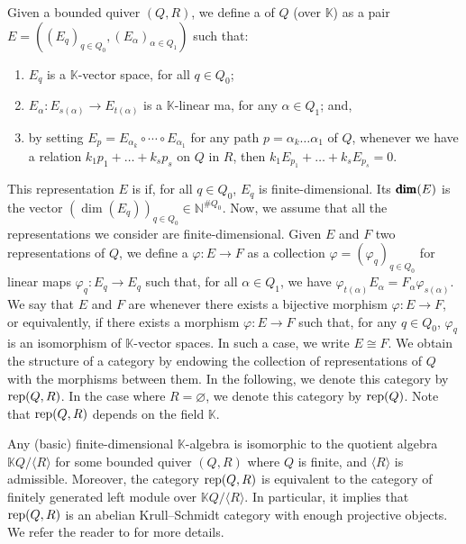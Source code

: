 Given a bounded quiver $(Q,R)$, we define a  of $Q$ (over $\mathbb{K}$) as a pair $E=((E_q)_{q \in Q_0}, (E_\alpha)_{\alpha \in Q_1})$ such that:
\begin{enumerate}[label=$\bullet$, itemsep=1mm]
    \item $E_q$ is a $\mathbb{K}$-vector space, for all $q \in Q_0$;
    \item  $E_\alpha : E_{s(\alpha)} \longrightarrow E_{t(\alpha)}$ is a $\mathbb{K}$-linear ma, for any $\alpha \in Q_1$; and,
    \item by setting $E_p = E_{\alpha_k} \circ \cdots \circ E_{\alpha_1}$ for any path $p = \alpha_k \ldots \alpha_1$ of $Q$, whenever we have a relation $k_1 p_1 + \ldots + k_s p_s$ on $Q$ in $R$, then $k_1 E_{p_1} + \ldots  + k_s E_{p_s} = 0$.
\end{enumerate}
This representation $E$ is  if, for all $q \in Q_0$, $E_q$ is finite-dimensional. Its  $\operatorname{\pmb{\dim}}(E)$ is the vector $(\dim(E_q))_{q \in Q_0} \in \mathbb{N}^{\#Q_0}$. Now, we assume that all the representations we consider are finite-dimensional. Given $E$ and $F$ two representations of $Q$, we define a  $\varphi : E \longrightarrow F$ as a collection $\varphi = (\varphi_q)_{q \in Q_0}$ for linear maps $\varphi_q : E_q \longrightarrow E_q$ such that, for all $\alpha \in Q_1$, we have $\varphi_{t(\alpha)} E_\alpha = F_\alpha \varphi_{s(\alpha)}$. We say that $E$ and $F$ are  whenever there exists a bijective morphism $\varphi : E \longrightarrow F$, or equivalently, if there exists a morphism $\varphi : E \longrightarrow F$ such that, for any $q \in Q_0$, $\varphi_q$ is an isomorphism of $\mathbb{K}$-vector spaces. In such a case, we write $E\cong F$. We obtain the structure of a category by endowing the collection of representations of $Q$ with the morphisms between them. In the following, we denote this category by $\operatorname{rep}(Q,R)$. In the case where $R = \varnothing$, we denote this category by $\operatorname{rep}(Q)$. Note that $\operatorname{rep}(Q, R)$ depends on the field $\mathbb{K}$.

 Any (basic) finite-dimensional $\mathbb{K}$-algebra is isomorphic to the quotient algebra $\mathbb{K}Q/\langle R \rangle$ for some bounded quiver $(Q,R)$ where $Q$ is finite, and $\langle R \rangle$ is admissible. Moreover, the category $\operatorname{rep}(Q,R)$ is equivalent to the category of finitely generated left module over $\mathbb{K}Q/\langle R \rangle$. In particular, it implies that $\operatorname{rep}(Q,R)$ is an abelian Krull--Schmidt category with enough projective objects. We refer the reader to \cite{ASS06} for more details. 
 
